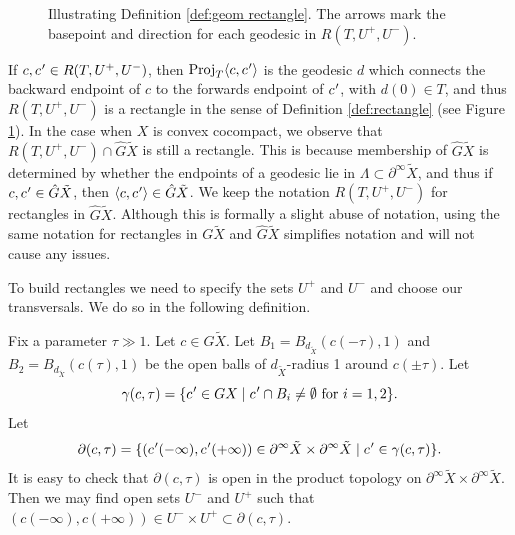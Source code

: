 \documentclass[11pt]{article}
\let\sep\mid
\newcommand{\cpr}{c\mkern1mu'}
\theoremstyle{definition}
\numberwithin{equation}{section}
\DeclareMathOperator{\Proj}{Proj}
\begin{document}
\begin{figure}[htb]
\caption{Illustrating Definition \ref{def:geom rectangle}. The arrows mark the basepoint and direction for each geodesic in $R(T,U^+,U^-)$.}\label{fig:geom rectangle}
\end{figure}
If $c, \cpr \in R(T,U^+,U^-)$, then $\Proj_T \langle c, \cpr\rangle $ is the geodesic $d$ which connects the backward endpoint of $c$ to the forwards endpoint of $\cpr$, with $d(0)\in T$, and thus $R(T,U^+,U^-)$ is a rectangle in the sense of Definition \ref{def:rectangle} (see Figure \ref{fig:geom rectangle}). In the case when $X$ is convex cocompact, we observe that $R(T, U^+, U^-)\cap \hat G\tilde X$ is still a rectangle. This is because membership of $\hat G\tilde X$ is determined by whether the endpoints of a geodesic lie in $\Lambda \subset \partial^\infty\tilde X$, and thus if $c, \cpr\in \hat G\tilde X$, then $\langle c,\cpr\rangle \in \hat G\tilde X$. We keep the notation $R(T, U^+, U^-)$ for rectangles in $\hat G \tilde X$. Although this is formally a slight abuse of notation, using the same notation for rectangles in $G \tilde X$ and $\hat G \tilde X$ simplifies notation and will not cause any issues.

To build rectangles we need to specify the sets $U^+$ and $U^-$ and choose our transversals. We do so in the following definition.

Fix a parameter $\tau \gg 1$. Let $c\in G\tilde X$. Let $B_1 = B_{d_{\tilde X}}(c(-\tau),1)$ and $B_2 = B_{d_{\tilde X}}(c(\tau),1)$ be the open balls of $d_{\tilde X}$-radius 1 around $c(\pm\tau)$. Let
\[ \gamma(c, \tau) = \{ \cpr\in GX \sep \cpr \cap B_i \neq \emptyset \mbox{ for } i=1,2 \}. \]
Let
\[ \partial (c, \tau) = \{ (\cpr(-\infty), \cpr(+\infty)) \in \partial^\infty \tilde X \times \partial^\infty \tilde X \sep \cpr\in \gamma(c,\tau) \}.\]
It is easy to check that $\partial (c, \tau)$ is open in the product topology on $\partial^\infty \tilde X \times \partial^\infty \tilde X$. Then we may find open sets $U^-$ and $U^+$ such that $(c(-\infty), c(+\infty)) \in U^- \times U^+ \subset \partial (c, \tau)$.
\end{document}
